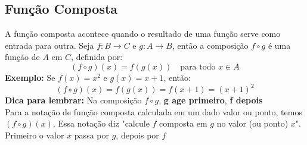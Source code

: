 \documentclass{article}
\begin{document}
\subsection{Função Composta}
A função composta acontece quando o resultado de uma função serve como entrada para outra.  
Seja \( f: B \to C \) e \( g: A \to B \), então a composição \( f \circ g \) é uma função de \( A \) em \( C \), definida por:
\[
(f \circ g)(x) = f(g(x)) \quad \text{para todo } x \in A
\]
\textbf{Exemplo:}  
Se \( f(x) = x^2 \) e \( g(x) = x + 1 \), então:
\[
(f \circ g)(x) = f(g(x)) = f(x + 1) = (x + 1)^2
\]
\textbf{Dica para lembrar:}  
Na composição \( f \circ g \), \textbf{g age primeiro}, \textbf{f depois}
\\[10pt]
Para a notação de função composta calculada em um dado valor ou ponto, temos \( (f \circ g) (x)\). Essa notação diz "calcule $f$ composta em $g$ no valor (ou ponto) $x$". Primeiro o valor $x$ passa por $g$, depois por $f$
\end{document}
